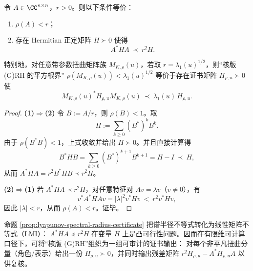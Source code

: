 \begin{proposition}\label{prop:lyapunov-spectral-radius-certificate}
令 $A\in\CC^{n\times n}$，$r>0$。则以下条件等价：
\begin{enumerate}
  \item $\rho(A)<r$；
  \item 存在 Hermitian 正定矩阵 $H\succ 0$ 使得
  \[
  \boxed{\;
  A^\ast H A\ \prec\ r^2 H.
  \;}
  \]
\end{enumerate}
特别地，对任意带参数扭曲矩阵族 $M_{K,\rho}(u)$，若取 $r=\lambda_1(u)^{1/2}$，则“核版 (G)RH 的平方根界”
\(
\rho(M_{K,\rho}(u))<\lambda_1(u)^{1/2}
\)
等价于存在证书矩阵 $H_{\rho,u}\succ 0$ 使
\[
M_{K,\rho}(u)^\ast H_{\rho,u} M_{K,\rho}(u)\ \prec\ \lambda_1(u)\,H_{\rho,u}.
\]
\end{proposition}
\begin{proof}
\textbf{(1)$\Rightarrow$(2)} 令 $B:=A/r$，则 $\rho(B)<1$。取
\[
H:=\sum_{k\ge 0}(B^\ast)^k B^k.
\]
由于 $\rho(B^\ast B)<1$，上式收敛并给出 $H\succ 0$。并且直接计算得
\[
B^\ast H B
=\sum_{k\ge 0}(B^\ast)^{k+1}B^{k+1}
=H-I\ \prec\ H,
\]
从而 $A^\ast H A=r^2 B^\ast H B\prec r^2 H$。

\textbf{(2)$\Rightarrow$(1)} 若 $A^\ast H A\prec r^2 H$，对任意特征对 $Av=\lambda v$（$v\neq 0$），有
\[
v^\ast A^\ast H A v=|\lambda|^2 v^\ast H v\ <\ r^2 v^\ast H v,
\]
因此 $|\lambda|<r$，从而 $\rho(A)<r$。证毕。
\end{proof}

\begin{remark}\label{rem:lyapunov-sdp}
命题 \ref{prop:lyapunov-spectral-radius-certificate} 把谱半径不等式转化为线性矩阵不等式（LMI）：
\(
A^\ast H A\preceq r^2 H
\)
在变量 $H$ 上是凸可行性问题。因而在有限维可计算口径下，可将“核版 (G)RH”组织为一组可审计的证书输出：
对每个非平凡扭曲分量（角色/表示）给出一份 $H_{\rho,u}\succ 0$，并同时输出残差矩阵
\(
r^2H_{\rho,u}-A^\ast H_{\rho,u}A
\)
以供复核。
\end{remark}
